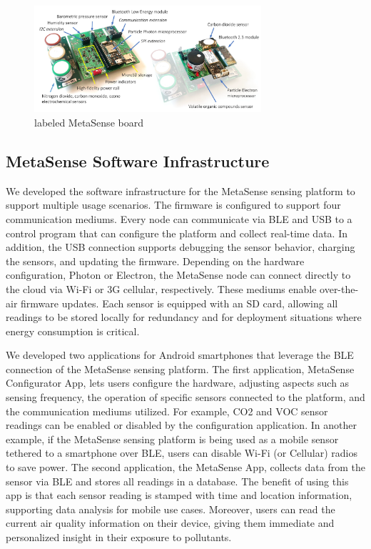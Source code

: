 \documentclass[journal abbreviation, manuscript]{copernicus}
\begin{document}
\begin{figure}[H]
\centering
\includegraphics[width=0.75\textwidth]{writeup/img/metasense-platform}
\caption{labeled MetaSense board}
\label{fig:img-label}
\end{figure}

\subsection{MetaSense Software Infrastructure}

We developed the software infrastructure for the MetaSense sensing platform to support multiple usage scenarios. The firmware is configured to support four communication mediums. Every node can communicate via BLE and USB to a control program that can configure the platform and collect real-time data. In addition, the USB connection supports debugging the sensor behavior, charging the sensors, and updating the firmware. Depending on the hardware configuration, Photon or Electron, the MetaSense node can connect directly to the cloud via Wi-Fi or 3G cellular, respectively. These mediums enable over-the-air firmware updates. Each sensor is equipped with an SD card, allowing all readings to be stored locally for redundancy and for deployment situations where energy consumption is critical.

We developed two applications for Android smartphones that leverage the BLE connection of the MetaSense sensing platform. The first application, MetaSense Configurator App, lets users configure the hardware, adjusting aspects such as sensing frequency, the operation of specific sensors connected to the platform, and the communication mediums utilized. For example, CO2 and VOC sensor readings can be enabled or disabled by the configuration application. In another example, if the MetaSense sensing platform is being used as a mobile sensor tethered to a smartphone over BLE, users can disable Wi-Fi (or Cellular) radios to save power. The second application, the MetaSense App, collects data from the sensor via BLE and stores all readings in a database. The benefit of using this app is that each sensor reading is stamped with time and location information, supporting data analysis for mobile use cases. Moreover, users can read the current air quality information on their device, giving them immediate and personalized insight in their exposure to pollutants.
\end{document}
